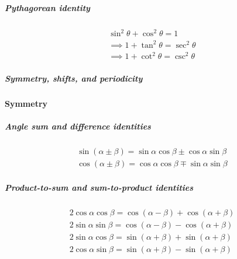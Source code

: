 \documentclass{article}
\begin{document}
\subparagraph{Pythagorean identity}
\begin{align*}
  \sin^2 \theta +   \cos^2 \theta = 1\\
  \implies 1 + \tan^2 \theta = \sec^2 \theta\\
  \implies 1 + \cot^2 \theta = \csc^2 \theta
\end{align*}

\subparagraph{Symmetry, shifts, and periodicity}
\textbf{Symmetry}


\subparagraph{Angle sum and difference identities}

\begin{align*}
  \sin(\alpha \pm \beta) = \sin\alpha \cos\beta \pm \cos\alpha \sin\beta\\
  \cos(\alpha \pm \beta) = \cos\alpha \cos\beta \mp \sin\alpha \sin\beta
\end{align*}

\subparagraph{Product-to-sum and sum-to-product identities}
\begin{align*}
   2 \cos \alpha \cos \beta = \cos(\alpha - \beta) + \cos(\alpha + \beta)\\
   2 \sin \alpha \sin \beta = \cos(\alpha - \beta) - \cos(\alpha + \beta)\\
   2 \sin \alpha \cos \beta = \sin(\alpha + \beta) + \sin(\alpha + \beta)\\
   2 \cos \alpha \sin \beta = \sin(\alpha + \beta) - \sin(\alpha + \beta)
\end{align*}


\end{document}
